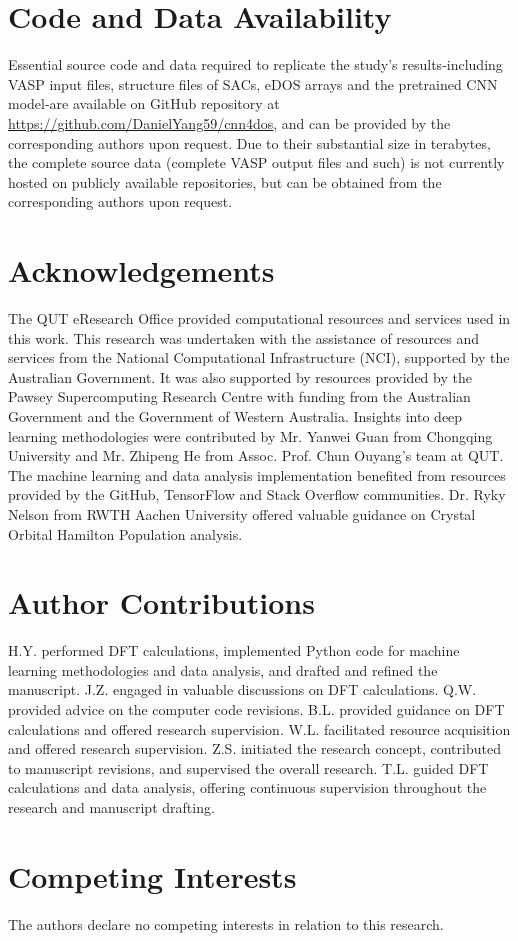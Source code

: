 \documentclass[a4paper, 12pt, titlepage]{article}
\begin{document}
\appendix
\newpage
    \section{Code and Data Availability}
    Essential source code and data required to replicate the study's results-including VASP input files,
    structure files of SACs, eDOS arrays and the pretrained CNN model-are available on GitHub repository
    at \url{https://github.com/DanielYang59/cnn4dos}, and can be provided by the corresponding authors upon request.
    Due to their substantial size in terabytes, the complete source data (complete VASP output files and such)
    is not currently hosted on publicly available repositories,
    but can be obtained from the corresponding authors upon request.


    \section{Acknowledgements}
    The QUT eResearch Office provided computational resources and services used in this work.
    This research was undertaken with the assistance of resources and services from
    the National Computational Infrastructure (NCI), supported by the Australian Government.
    It was also supported by resources provided by the Pawsey Supercomputing Research Centre
    with funding from the Australian Government and the Government of Western Australia.
    Insights into deep learning methodologies were contributed by Mr. Yanwei Guan
    from Chongqing University and Mr. Zhipeng He from Assoc. Prof. Chun Ouyang's team at QUT.
    The machine learning and data analysis implementation benefited from
    resources provided by the GitHub, TensorFlow and Stack Overflow communities.
    Dr. Ryky Nelson from RWTH Aachen University offered valuable guidance on
    Crystal Orbital Hamilton Population analysis.


    \section{Author Contributions}
    H.Y. performed DFT calculations, implemented Python code for
    machine learning methodologies and data analysis,
    and drafted and refined the manuscript.
    J.Z. engaged in valuable discussions on DFT calculations.
    Q.W. provided advice on the computer code revisions.
    B.L. provided guidance on DFT calculations and offered research supervision.
    W.L. facilitated resource acquisition and offered research supervision.
    Z.S. initiated the research concept, contributed to manuscript revisions, and supervised the overall research.
    T.L. guided DFT calculations and data analysis, offering continuous supervision
    throughout the research and manuscript drafting.


    \section{Competing Interests}
    The authors declare no competing interests in relation to this research.


\newpage


\end{document}
